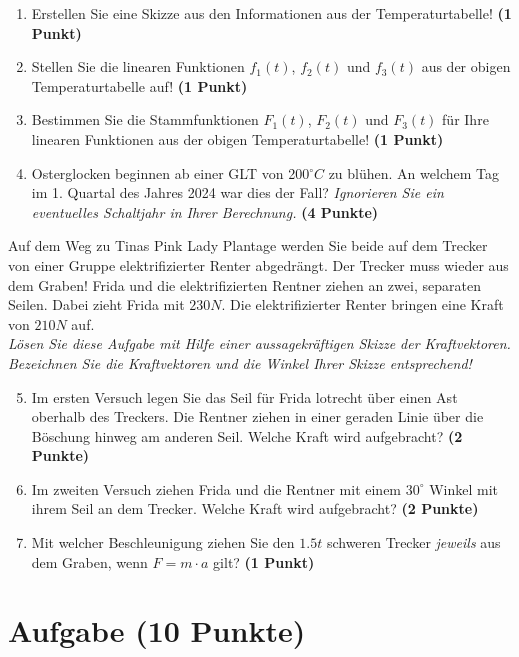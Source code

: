 \documentclass[a4paper, 9pt]{scrartcl}\usepackage[]{graphicx}\usepackage[]{xcolor}
\begin{document}
\begin{enumerate}
\item Erstellen Sie eine Skizze aus den Informationen aus der Temperaturtabelle!  \textbf{(1 Punkt)}
\item Stellen Sie die linearen Funktionen $f_1(t)$, $f_2(t)$ und $f_3(t)$ aus der obigen Temperaturtabelle auf!  \textbf{(1 Punkt)}
\item Bestimmen Sie die Stammfunktionen $F_1(t)$, $F_2(t)$ und $F_3(t)$ für Ihre linearen Funktionen aus der obigen Temperaturtabelle!  \textbf{(1 Punkt)}
\item Osterglocken beginnen ab einer GLT von 200$^\circ C$ zu blühen. An welchem Tag im 1. Quartal des Jahres 2024 war dies der Fall? \textit{Ignorieren Sie ein eventuelles Schaltjahr in Ihrer Berechnung.} \textbf{(4 Punkte)}
\end{enumerate}

Auf dem Weg zu Tinas Pink Lady Plantage werden Sie beide auf dem Trecker von einer Gruppe elektrifizierter Renter abgedrängt. Der Trecker muss wieder aus dem Graben! Frida und die elektrifizierten Rentner ziehen an zwei, separaten Seilen. Dabei zieht Frida mit $230N$. Die elektrifizierter Renter  bringen eine Kraft von $210N$ auf.\\

\textit{Lösen Sie diese Aufgabe mit Hilfe einer aussagekräftigen Skizze der Kraftvektoren. Bezeichnen Sie die Kraftvektoren und die Winkel Ihrer Skizze entsprechend!}

\begin{enumerate}
  \setcounter{enumi}{4}  
\item Im ersten Versuch legen Sie das Seil für Frida lotrecht über einen Ast oberhalb des Treckers. Die Rentner ziehen in einer geraden Linie über die Böschung hinweg am anderen Seil. Welche Kraft wird aufgebracht?  \textbf{(2 Punkte)}
\item Im zweiten Versuch ziehen Frida und die Rentner mit einem $30^\circ$ Winkel mit ihrem Seil an dem Trecker. Welche Kraft wird aufgebracht? \textbf{(2 Punkte)}
\item Mit welcher Beschleunigung ziehen Sie den $1.5t$ schweren Trecker \textit{jeweils} aus dem Graben, wenn $F = m \cdot a$ gilt? \textbf{(1 Punkt)}
\end{enumerate}

 
\clearpage

\section{Aufgabe \hfill (10 Punkte)}
\end{document}
